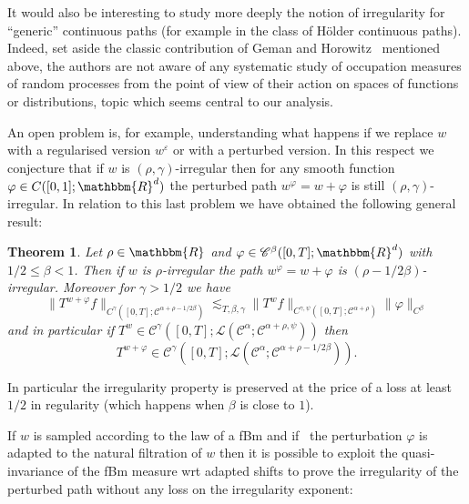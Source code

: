 \documentclass[a4paper,11pt]{article}
\newtheorem{theorem}{Theorem}[section]
\newcommand{\CC}{\mathscr C}
\begin{document}
It would also be interesting to study more deeply the notion of irregularity
for ``generic'' continuous paths (for example in the class of H\"older
continuous paths). Indeed, set aside the classic contribution of Geman and
Horowitz~{\cite{geman_occupation_1980}} mentioned above, the authors are not
aware of any systematic study of occupation measures of random processes from
the point of view of their action on spaces of functions or distributions,
topic which seems central to our analysis.



An open problem is, for example, understanding what happens if we replace $w$
with a regularised version $w^{\varepsilon}$ or with a perturbed version. In
this respect we conjecture that if $w$ is $( \rho , \gamma )$-irregular then
for any smooth function $\varphi \in C ( [ 0,1 ] ;\mathbbm{R}^{d} )$ the
perturbed path $w^{\varphi} =w+ \varphi$ is still $( \rho , \gamma
)$-irregular. In relation to this last problem we have obtained the following
general result:

\begin{theorem}
  \label{th:perturbed-young}Let $\rho \in \mathbbm{R}$ and $\varphi \in
  \CC^{\beta} ( [ 0,T ] ;\mathbbm{R}^{d} )$ with $1/2 \leqslant \beta <1$.
  Then if $w$ is $\rho$-irregular the path $w^{\varphi} =w+ \varphi$ is $(
  \rho -1/2 \beta )$-irregular. Moreover for $\gamma >1/2$ we have
  \[ \| T^{w+ \varphi}_{} f \|_{C^{\gamma} \left( [ 0,T ] ; \CC^{\alpha + \rho
     -1/2 \beta} \right)} \lesssim_{T, \beta , \gamma} \| T^{w} f
     \|_{C^{\gamma , \psi} \left( [ 0,T ] ; \CC^{\alpha + \rho} \right)} \|
     \varphi \|_{C^{\beta}} \]
  and in particular if $T^{w} \in \CC^{\gamma} \left( [ 0,T ] ;\mathcal{L}
  \left( \CC^{\alpha} ; \CC^{\alpha + \rho , \psi} \right) \right)$ then
  $$T^{w+ \varphi} \in \CC^{\gamma} \left( [ 0,T ] ;\mathcal{L} \left(
  \CC^{\alpha} ; \CC^{\alpha + \rho -1/2 \beta} \right) \right).$$
\end{theorem}

In particular the irregularity property is preserved at the price of a loss at
least $1/2$ in regularity (which happens when $\beta$ is close to $1$).



If $w$ is sampled according to the law of a fBm and if \ the perturbation
$\varphi$ is adapted to the natural filtration of $w$ then it is possible to
exploit the quasi-invariance of the fBm measure wrt adapted shifts to prove
the irregularity of the perturbed path without any loss on the irregularity
exponent:
\end{document}
